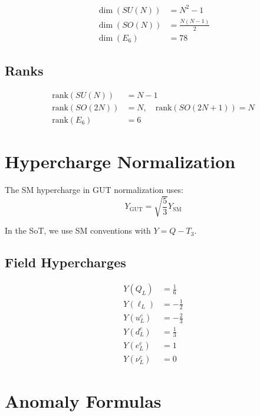 \documentclass[11pt,a4paper]{article}
\begin{document}
\begin{align}
\label{eq:dim-sun}
\dim(SU(N)) &= N^2 - 1 \\
\label{eq:dim-son}
\dim(SO(N)) &= \frac{N(N-1)}{2} \\
\label{eq:dim-e6}
\dim(E_6) &= 78
\end{align}

\subsection{Ranks}
\label{app:ranks}

\begin{align}
\label{eq:rank-sun}
\text{rank}(SU(N)) &= N - 1 \\
\label{eq:rank-son}
\text{rank}(SO(2N)) &= N, \quad \text{rank}(SO(2N+1)) = N \\
\label{eq:rank-e6}
\text{rank}(E_6) &= 6
\end{align}

\section{Hypercharge Normalization}
\label{app:hypercharge}

The SM hypercharge in GUT normalization uses:
\begin{equation}
\label{eq:hypercharge-norm}
Y_{\text{GUT}} = \sqrt{\frac{5}{3}} Y_{\text{SM}}
\end{equation}

In the SoT, we use SM conventions with $Y = Q - T_3$.

\subsection{Field Hypercharges}
\label{app:field-hypercharges}

\begin{align}
\label{eq:y-ql}
Y(Q_L) &= \frac{1}{6} \\
\label{eq:y-ll}
Y(\ell_L) &= -\frac{1}{2} \\
\label{eq:y-ucl}
Y(u^c_L) &= -\frac{2}{3} \\
\label{eq:y-dcl}
Y(d^c_L) &= \frac{1}{3} \\
\label{eq:y-ecl}
Y(e^c_L) &= 1 \\
\label{eq:y-nucl}
Y(\nu^c_L) &= 0
\end{align}

\section{Anomaly Formulas}
\label{app:anomaly-formulas}
\end{document}
